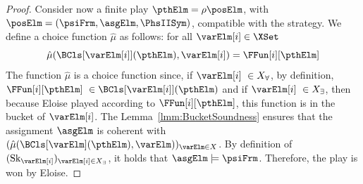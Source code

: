 \documentclass[authoryear]{elsarticle}
\newcommand{\VarX}[1][]{{X_{#1}}}
\newcommand{\choiceFunBucket}{\mu}
\newcommand{\SkolemizedSOF}{\text{Sk}}
\newcommand{\choiceFunBucketWinning}{\hat{\choiceFunBucket}}
\begin{document}
\begin{proof}


  Consider now a finite play $\pthElm = \rho\posElm$, with $\posElm = (\psiFrm,
  \asgElm, \PhsIISym)$, compatible with the strategy.
%
  We define a choice function $\choiceFunBucketWinning$ as follows: for all
  $\varElm[i]\in \XSet$
%
  $$\choiceFunBucketWinning(\BCls[{\varElm[i]}](\pthElm), \varElm[i]) =
  \FFun[i][{\pthElm}]$$
%
  The function $\choiceFunBucketWinning$ is a choice function since, if
  $\varElm[i] \in \VarX[\forall]$, by definition, $\FFun[i][\pthElm] \in
  \BCls[{\varElm[i]}](\pthElm)$ and if $\varElm[i] \in \VarX[\exists]$, then
  because Eloise played according to $\FFun[i][\pthElm]$, this function is in
  the bucket of $\varElm[i]$. The Lemma~\ref{lmm:BucketSoundness} ensures that
  the assignment $\asgElm$ is coherent with
  $(\choiceFunBucketWinning(\BCls[\varElm](\pthElm),\varElm))_{\varElm\in\VarX}$. By
  definition of $(\SkolemizedSOF_{\varElm[i]})_{\varElm[i] \in \VarX[\exists]}$,
  it holds that $\asgElm \models \psiFrm$. Therefore, the play is won by Eloise.


\end{proof}
\end{document}
